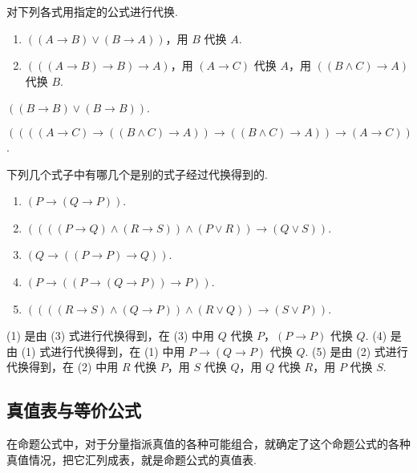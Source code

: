 \begin{example}
    对下列各式用指定的公式进行代换.
    \begin{enumerate}[label=(\arabic{*})]
        \item $((A\to B)\vee (B\to A))$，用 $B$ 代换 $A$.
        \item $(((A\to B)\to B)\to A)$，用 $(A\to C)$ 代换 $A$，用 $((B\wedge C)\to A)$ 代换 $B$.
    \end{enumerate}
\end{example}
\begin{solution}
    \begin{enumerate*}[label=(\arabic{*})]
        \item $((B\to B)\vee (B\to B))$.
        \item $((((A\to C)\to ((B\wedge C)\to A))\to ((B\wedge C)\to A))\to (A\to C))$.
    \end{enumerate*}
\end{solution}

\begin{example}
    下列几个式子中有哪几个是别的式子经过代换得到的.
    \begin{enumerate}[label=(\arabic{*})]
        \item $(P\to(Q\to P))$.
        \item $((((P\to Q)\wedge (R\to S))\wedge (P\vee R))\to (Q\vee S))$.
        \item $(Q\to ((P\to P)\to Q))$.
        \item $(P\to ((P\to (Q\to P))\to P))$.
        \item $((((R\to S)\wedge (Q\to P))\wedge (R\vee Q))\to (S\vee P))$.
    \end{enumerate}
\end{example}
\begin{solution}
    (1) 是由 (3) 式进行代换得到，在 (3) 中用 $Q$ 代换 $P$，$(P\to P)$ 代换 $Q$.
    (4) 是由 (1) 式进行代换得到，在 (1) 中用 $P\to(Q\to P)$ 代换 $Q$.
    (5) 是由 (2) 式进行代换得到，在 (2) 中用 $R$ 代换 $P$，用 $S$ 代换 $Q$，用 $Q$ 代换 $R$，用 $P$ 代换 $S$.
\end{solution}

\subsection{真值表与等价公式}

\begin{definition}[真值表]
    在命题公式中，对于分量指派真值的各种可能组合，就确定了这个命题公式的各种真值情况，把它汇列成表，就是命题公式的真值表.
\end{definition}

